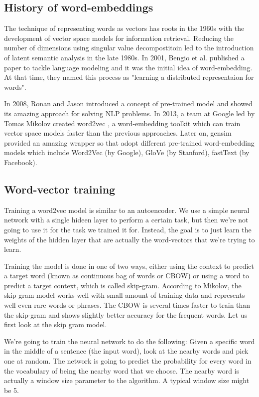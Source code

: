 \newpage
\subsection{History of word-embeddings}

The technique of representing words as vectors has roots in the 1960s with the development of vector space models for information retrieval. Reducing the number of dimensions using singular value decompostitoin led to the introduction of latent semantic analysis in the late 1980s. In 2001, Bengio et al. \cite{bengio2003neural} published a paper to tackle language modeling and it was the initial idea of word-embedding. At that time, they named this process as "learning a distributed representaion for words".

In 2008, Ronan and Jason \cite{collobert2008unified} introduced a concept of pre-trained model and showed its amazing approach for solving NLP problems. In 2013, a team at Google led by Tomas Mikolov created word2vec \cite{mikolov2013efficient}, a word-embedding toolkit which can train vector space models faster than the previous approaches. Later on, gensim provided an amazing wrapper so that adopt different pre-trained word-embedding models which include Word2Vec (by Google), GloVe \cite{pennington2014glove} (by Stanford), fastText (by Facebook).

\subsection{Word-vector training}

Training a word2vec model is similar to an autoencoder. We use a simple neural network with a single hideen layer to perform a certain task, but then we're not going to use it for the task we trained it for. Instead, the goal is to just learn the weights of the hidden layer that are actually the word-vectors that we're trying to learn.

Training the model is done in one of two ways, either using the context to predict a target word (known as continuous bag of words or CBOW) or using a word to predict a target context, which is called skip-gram. According to Mikolov, the skip-gram model works well with small amount of training data and represents well even rare words or phrases. The CBOW is several times faster to train than the skip-gram and shows slightly better accuracy for the frequent words. Let us first look at the skip gram model.

We're going to train the neural network to do the following: Given a specific word in the middle of a sentence (the input word), look at the nearby words and pick one at random. The network is going to predict the probability for every word in the vocabulary of being the nearby word that we choose. The nearby word is actually a window size parameter to the algorithm. A typical window size might be 5.

